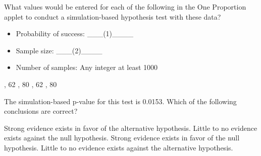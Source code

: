 \documentclass{article}
\begin{document}
\begin{mcquestions}
		\question[follow] What values would be entered for each of the following in the One Proportion applet to conduct a simulation-based hypothesis test with these data?
		\begin{itemize}
			\item Probability of success: \_\_\_(1)\_\_\_\_
			\item Sample size: \_\_\_(2)\_\_\_\_
			\item Number of samples: Any integer at least 1000
		\end{itemize}
		\begin{mcanswerslist}
			, 62
			, 80
			, 62
			, 80
		\end{mcanswerslist}
		
		\question[follow] The simulation-based p-value for this test is 0.0153. Which of the following conclusions are correct?
		\begin{mcanswerslist}
			\answer[correct] Strong evidence exists in favor of the alternative hypothesis.
			\answer Little to no evidence exists against the null hypothesis.
			\answer Strong evidence exists in favor of the null hypothesis.
			\answer Little to no evidence exists against the alternative hypothesis.
		\end{mcanswerslist}
		
	\end{mcquestions}
\end{document}
